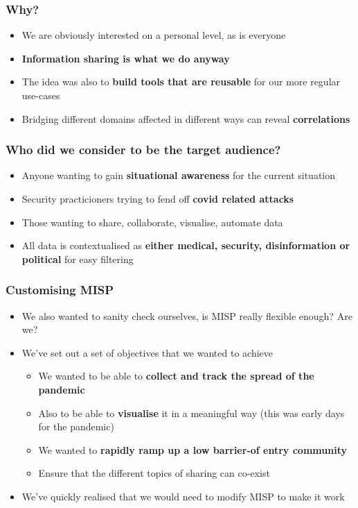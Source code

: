 \begin{frame}
 \frametitle{Why?}
 \begin{itemize}
         \item We are obviously interested on a personal level, as is everyone
         \item {\bf Information sharing is what we do anyway}
         \item The idea was also to {\bf build tools that are reusable} for our more regular use-cases
         \item Bridging different domains affected in different ways can reveal {\bf correlations}
 \end{itemize}
\end{frame}

\begin{frame}
 \frametitle{Who did we consider to be the target audience?}
 \begin{itemize}
         \item Anyone wanting to gain {\bf situational awareness} for the current situation
         \item Security practicioners trying to fend off {\bf covid related attacks}
         \item Those wanting to share, collaborate, visualise, automate data
         \item All data is contextualised as {\bf either medical, security, disinformation or political} for easy filtering
 \end{itemize}
\end{frame}


\begin{frame}
 \frametitle{Customising MISP}
 \begin{itemize}
         \item We also wanted to sanity check ourselves, is MISP really flexible enough? Are we?
         \item We've set out a set of objectives that we wanted to achieve
         \begin{itemize}
              \item We wanted to be able to {\bf collect and track the spread of the pandemic}
              \item Also to be able to {\bf visualise} it in a meaningful way (this was early days for the pandemic)
              \item We wanted to {\bf rapidly ramp up a low barrier-of entry community}
              \item Ensure that the different topics of sharing can co-exist
         \end{itemize}
         \item We've quickly realised that we would need to modify MISP to make it work
 \end{itemize}
\end{frame}

